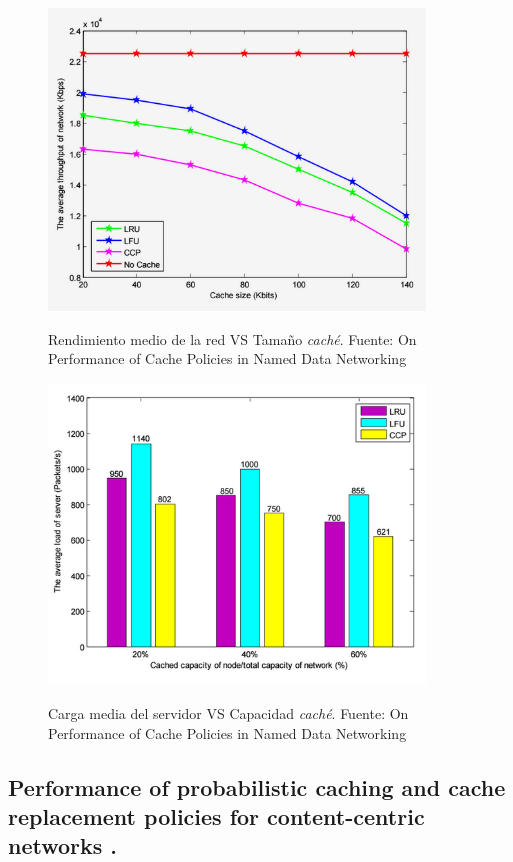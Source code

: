 \documentclass[12pt]{ociamthesis}  %
\begin{document}
\begin{figure}[!htb]
	\centering
	\includegraphics[width=10cm]{Imagenes/Paper1.1/Grafico_RendimientoRed_vs_cachesize}\\
	\caption{Rendimiento medio de la red VS Tamaño \textit{caché}. Fuente: On Performance of Cache Policies in Named Data Networking \cite{ran2013performance}}
	\label{RendimientoRed_vs_cssize}
\end{figure}

\begin{figure}[!htb]
	\centering
	\includegraphics[width=10cm]{Imagenes/Paper1.1/Grafico_cargaservidor_vs_capacidadcache}\\
	\caption{ Carga media del servidor VS Capacidad \textit{caché}. Fuente: On Performance of Cache Policies in Named Data Networking \cite{ran2013performance}}
	\label{cargaServidor_vs_CapacidadCS}
\end{figure}

\clearpage

\subsection{Performance of probabilistic caching and cache replacement policies for content-centric networks \cite{tarnoi2014performance}.}
\end{document}
